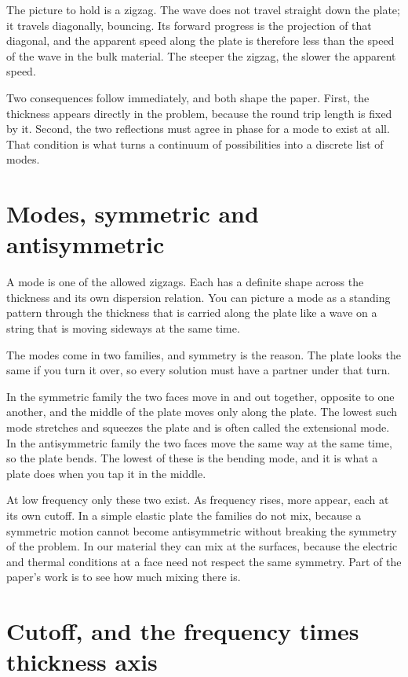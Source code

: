 \documentclass[11pt]{article}
\begin{document}
The picture to hold is a zigzag. The wave does not travel straight down the plate; it travels diagonally,
bouncing. Its forward progress is the projection of that diagonal, and the apparent speed along the plate is
therefore less than the speed of the wave in the bulk material. The steeper the zigzag, the slower the
apparent speed.

Two consequences follow immediately, and both shape the paper. First, the thickness appears directly in the
problem, because the round trip length is fixed by it. Second, the two reflections must agree in phase for a
mode to exist at all. That condition is what turns a continuum of possibilities into a discrete list of
modes.

\section{Modes, symmetric and antisymmetric}

A mode is one of the allowed zigzags. Each has a definite shape across the thickness and its own dispersion
relation. You can picture a mode as a standing pattern through the thickness that is carried along the plate
like a wave on a string that is moving sideways at the same time.

The modes come in two families, and symmetry is the reason. The plate looks the same if you turn it over, so
every solution must have a partner under that turn.

In the symmetric family the two faces move in and out together, opposite to one another, and the middle of
the plate moves only along the plate. The lowest such mode stretches and squeezes the plate and is often
called the extensional mode. In the antisymmetric family the two faces move the same way at the same time, so
the plate bends. The lowest of these is the bending mode, and it is what a plate does when you tap it in the
middle.

At low frequency only these two exist. As frequency rises, more appear, each at its own cutoff. In a simple
elastic plate the families do not mix, because a symmetric motion cannot become antisymmetric without
breaking the symmetry of the problem. In our material they can mix at the surfaces, because the electric and
thermal conditions at a face need not respect the same symmetry. Part of the paper's work is to see how much
mixing there is.

\section{Cutoff, and the frequency times thickness axis}
\end{document}
